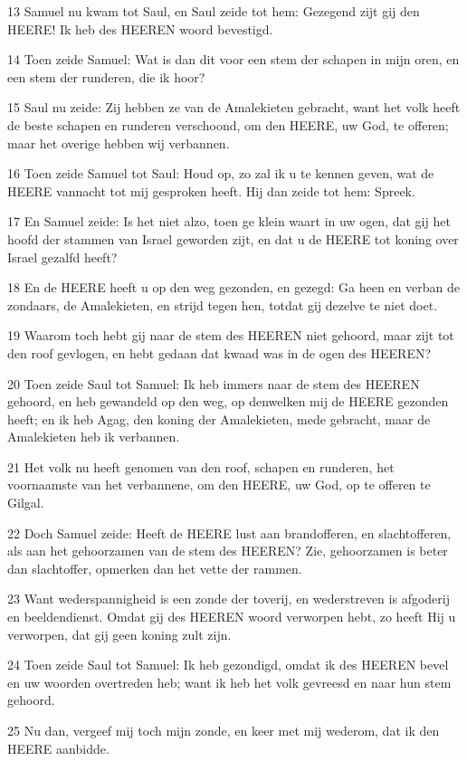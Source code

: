 \par 13 Samuel nu kwam tot Saul, en Saul zeide tot hem: Gezegend zijt gij den HEERE! Ik heb des HEEREN woord bevestigd.
\par 14 Toen zeide Samuel: Wat is dan dit voor een stem der schapen in mijn oren, en een stem der runderen, die ik hoor?
\par 15 Saul nu zeide: Zij hebben ze van de Amalekieten gebracht, want het volk heeft de beste schapen en runderen verschoond, om den HEERE, uw God, te offeren; maar het overige hebben wij verbannen.
\par 16 Toen zeide Samuel tot Saul: Houd op, zo zal ik u te kennen geven, wat de HEERE vannacht tot mij gesproken heeft. Hij dan zeide tot hem: Spreek.
\par 17 En Samuel zeide: Is het niet alzo, toen ge klein waart in uw ogen, dat gij het hoofd der stammen van Israel geworden zijt, en dat u de HEERE tot koning over Israel gezalfd heeft?
\par 18 En de HEERE heeft u op den weg gezonden, en gezegd: Ga heen en verban de zondaars, de Amalekieten, en strijd tegen hen, totdat gij dezelve te niet doet.
\par 19 Waarom toch hebt gij naar de stem des HEEREN niet gehoord, maar zijt tot den roof gevlogen, en hebt gedaan dat kwaad was in de ogen des HEEREN?
\par 20 Toen zeide Saul tot Samuel: Ik heb immers naar de stem des HEEREN gehoord, en heb gewandeld op den weg, op denwelken mij de HEERE gezonden heeft; en ik heb Agag, den koning der Amalekieten, mede gebracht, maar de Amalekieten heb ik verbannen.
\par 21 Het volk nu heeft genomen van den roof, schapen en runderen, het voornaamste van het verbannene, om den HEERE, uw God, op te offeren te Gilgal.
\par 22 Doch Samuel zeide: Heeft de HEERE lust aan brandofferen, en slachtofferen, als aan het gehoorzamen van de stem des HEEREN? Zie, gehoorzamen is beter dan slachtoffer, opmerken dan het vette der rammen.
\par 23 Want wederspannigheid is een zonde der toverij, en wederstreven is afgoderij en beeldendienst. Omdat gij des HEEREN woord verworpen hebt, zo heeft Hij u verworpen, dat gij geen koning zult zijn.
\par 24 Toen zeide Saul tot Samuel: Ik heb gezondigd, omdat ik des HEEREN bevel en uw woorden overtreden heb; want ik heb het volk gevreesd en naar hun stem gehoord.
\par 25 Nu dan, vergeef mij toch mijn zonde, en keer met mij wederom, dat ik den HEERE aanbidde.
